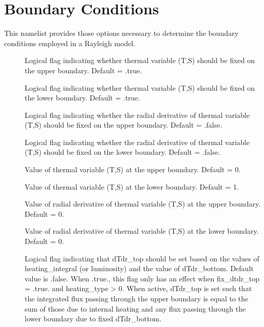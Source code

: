 \documentclass[letterpaper,11pt,english]{sphinxmanual}
\begin{document}
\section{Boundary Conditions}
\label{\detokenize{doc/source/Namelist_Definitions/Namelist_Variables:boundary-conditions}}
\sphinxAtStartPar
This namelist provides those options necessary to determine the boundary conditions employed in a Rayleigh model.
\begin{description}
\item[{}] \leavevmode
\sphinxAtStartPar
Logical flag indicating whether thermal variable (T,S) should be fixed on the upper boundary.  Default = .true.

\item[{}] \leavevmode
\sphinxAtStartPar
Logical flag indicating whether thermal variable (T,S) should be fixed on the lower boundary.  Default = .true.

\item[{}] \leavevmode
\sphinxAtStartPar
Logical flag indicating whether the radial derivative of thermal variable (T,S) should be fixed on the upper boundary.  Default = .false.

\item[{}] \leavevmode
\sphinxAtStartPar
Logical flag indicating whether the radial derivative of thermal variable (T,S) should be fixed on the lower boundary.  Default = .false.

\item[{}] \leavevmode
\sphinxAtStartPar
Value of thermal variable (T,S) at the upper boundary.  Default = 0.

\item[{}] \leavevmode
\sphinxAtStartPar
Value of thermal variable (T,S) at the lower boundary.  Default = 1.

\item[{}] \leavevmode
\sphinxAtStartPar
Value of radial derivative of thermal variable (T,S) at the upper boundary.  Default = 0.

\item[{}] \leavevmode
\sphinxAtStartPar
Value of radial derivative of thermal variable (T,S) at the lower boundary.  Default = 0.

\item[{}] \leavevmode
\sphinxAtStartPar
Logical flag indicating that dTdr\_top should be set based on the values of heating\_integral (or luminosity) and the value of dTdr\_bottom.  Default value is .false.  When .true., this flag only has an effect when fix\_dtdr\_top = .true. and heating\_type \textgreater{} 0.  When active, dTdr\_top is set such that the integrated flux passing through the upper boundary is equal to the sum of those due to internal heating and any flux passing through the lower boundary due to fixed dTdr\_bottom.


\end{description}
\end{document}
